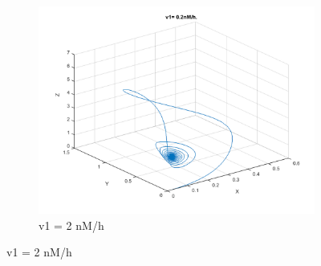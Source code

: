 \documentclass[10pt,a4paper,oneside,twocolumn]{article}
\numberwithin{equation}{section} %
\begin{document}
\begin{figure}
\begin{subfigure}[b]{0.32\textwidth}
	    \includegraphics[width=\textwidth]{LotsofthesameA/A-AA2.png}
	    \caption{v1 = 2 nM/h}
	\end{subfigure}
	 

\end{figure}
\end{document}
